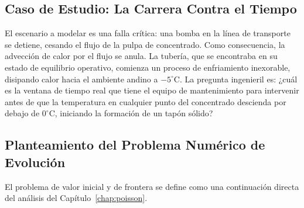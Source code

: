 \subsection{Caso de Estudio: La Carrera Contra el Tiempo}
El escenario a modelar es una falla crítica: una bomba en la línea de transporte se detiene, cesando el flujo de la pulpa de concentrado. Como consecuencia, la advección de calor por el flujo se anula. La tubería, que se encontraba en su estado de equilibrio operativo, comienza un proceso de enfriamiento inexorable, disipando calor hacia el ambiente andino a \(-5^\circ\text{C}\). La pregunta ingenieril es: ¿cuál es la ventana de tiempo real que tiene el equipo de mantenimiento para intervenir antes de que la temperatura en cualquier punto del concentrado descienda por debajo de \(0^\circ\text{C}\), iniciando la formación de un tapón sólido?

\subsection{Planteamiento del Problema Numérico de Evolución}
El problema de valor inicial y de frontera se define como una continuación directa del análisis del Capítulo~\ref{chap:poisson}.

